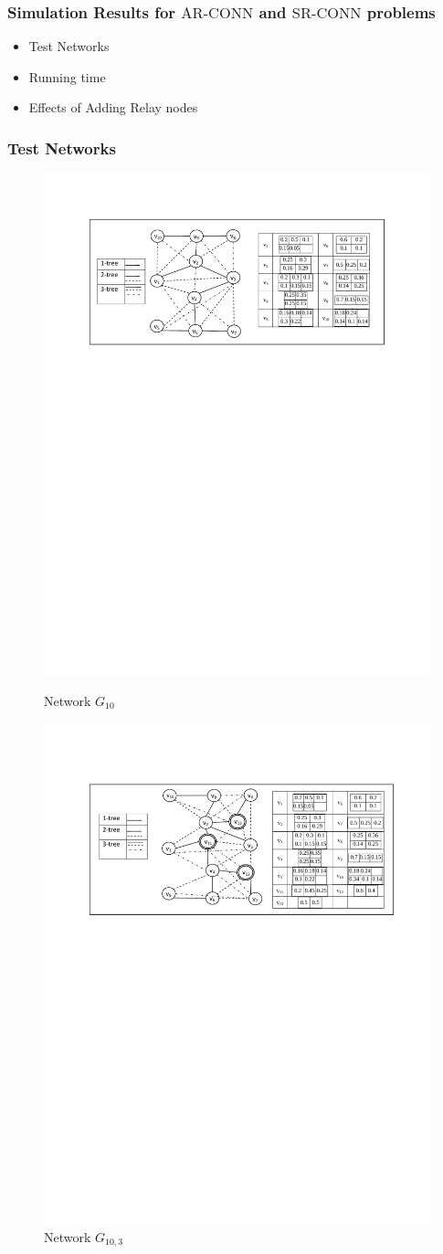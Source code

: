 \documentclass{beamer}
\newcommand{\ARCONN}   { {\mathrm {AR\mbox{-}CONN}} }
\newcommand{\SRCONN}   { {\mathrm {SR\mbox{-}CONN}} }
\begin{document}
\begin{frame}
\frametitle{Simulation Results for $\ARCONN$ and $\SRCONN$ problems}
\begin{itemize}
\item Test Networks
\item Running time
\item Effects of Adding Relay nodes
\end{itemize}
\end{frame}

\begin{frame}
\frametitle{Test Networks}
\vspace{-0.5em}
\begin{figure}[!htb]
\begin{minipage}{.8\linewidth}
\includegraphics[width=4 in, height=1.2 in]{NetworkI_paper.pdf}
\caption{Network $G_{10}$}
\label{fig:netI1}
\end{minipage}
\begin{minipage}{.8\linewidth}
\includegraphics[width=4 in, height=1.2 in]{NetworkI_paper_Relay.pdf}
\vspace{-0.7 cm}
\caption{Network $G_{10,3}$}
\label{fig:netIR}
\end{minipage}
\end{figure}

\end{frame}
\end{document}
